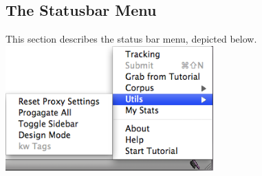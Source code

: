 \documentclass[12pt]{article}
\begin{document}
\subsection{The Statusbar Menu}

This section describes the status bar menu, depicted below. \\

\includegraphics[width=0.6\textwidth]{images/stsbrmenu.png}
\medskip
\end{document}
